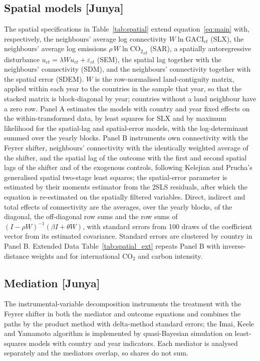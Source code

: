 \documentclass[12pt]{article}
\begin{document}
\subsection*{Spatial models [Junya]}
The spatial specifications in Table~\ref{tab:spatial} extend
equation~\ref{eq:main} with, respectively, the neighbours' average log
connectivity $W \ln \mathrm{GACI}_{ct}$ (SLX), the neighbours' average log
emissions $\rho\, W \ln \mathrm{CO_2}_{ct}$ (SAR), a spatially
autoregressive disturbance $u_{ct} = \lambda W u_{ct} + \varepsilon_{ct}$
(SEM), the spatial lag together with the neighbours' connectivity (SDM),
and the neighbours' connectivity together with the spatial error (SDEM).
$W$ is the row-normalised land-contiguity matrix, applied within each year
to the countries in the sample that year, so that the stacked matrix is
block-diagonal by year; countries without a land neighbour have a zero row.
Panel A estimates the models with country and year fixed effects on the
within-transformed data, by least squares for SLX and by maximum
likelihood for the spatial-lag and spatial-error models, with the
log-determinant summed over the yearly blocks. Panel B instruments own
connectivity with the Feyrer shifter, neighbours' connectivity with the
identically weighted average of the shifter, and the spatial lag of the
outcome with the first and second spatial lags of the shifter and of the
exogenous controls, following Kelejian and Prucha's generalised spatial
two-stage least squares; the spatial-error parameter is estimated by their
moments estimator from the 2SLS residuals, after which the equation is
re-estimated on the spatially filtered variables. Direct, indirect and
total effects of connectivity are the averages, over the yearly blocks, of
the diagonal, the off-diagonal row sums and the row sums of $(I-\rho
W)^{-1}(\beta I + \theta W)$, with standard errors from 100 draws of the
coefficient vector from its estimated covariance. Standard errors are
clustered by country in Panel B. Extended Data
Table~\ref{tab:spatial_ext} repeats Panel B with inverse-distance weights
and for international CO$_2$ and carbon intensity.

\subsection*{Mediation [Junya]}
The instrumental-variable decomposition instruments the treatment with the
Feyrer shifter in both the mediator and outcome equations and combines the
paths by the product method with delta-method standard errors; the Imai,
Keele and Yamamoto algorithm is implemented by quasi-Bayesian simulation on
least-squares models with country and year indicators. Each mediator is
analysed separately and the mediators overlap, so shares do not sum.
\end{document}
